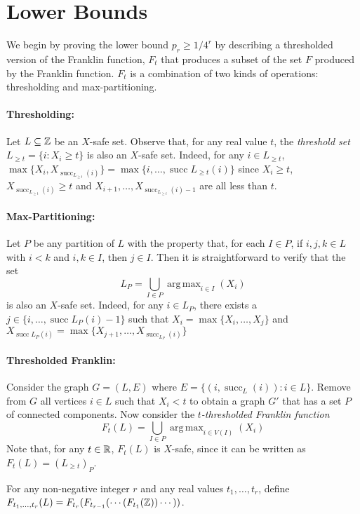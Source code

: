 \documentclass{patmorin}
\DeclareMathOperator*{\argmax}{arg\,max}
\DeclareMathOperator{\cw}{succ}
\begin{document}
\section{Lower Bounds}

We begin by proving the lower bound $p_r \ge 1/4^r$ by describing a
thresholded version of the Franklin function, $F_t$ that produces a
subset of the set $F$ produced by the Franklin function. $F_t$ is a
combination of two kinds of operations: thresholding and max-partitioning.

\paragraph{Thresholding:}
Let $L\subseteq\mathbb{Z}$ be an $X$-safe set.  Observe that, for any real
value $t$, the \emph{threshold set} $L_{\ge t}=\{i:X_i\ge t\}$ is also an
$X$-safe set. Indeed, for any $i\in L_{\ge t}$, $\max\{X_i,X_{\cw_{L_{\ge t}}(i)}\} = \max\{i,\ldots,\cw{L_{\ge t}}(i)\}$ since $X_i\ge t$, $X_{\cw_{L_{\ge t}}(i)}\ge t$ and $X_{i+1},\ldots,X_{\cw_{L_{\ge t}}(i)-1}$ are all less than $t$.

\paragraph{Max-Partitioning:}
Let $P$ be any partition of $L$ with the property that, for each $I\in
P$, if $i,j,k\in L$ with $i < k$ and $i,k\in I$, then $j\in I$. Then it
is straightforward to verify that the set
\[
     L_{P} = \bigcup_{I\in P} \argmax_{i\in I}(X_i)
\]
is also an $X$-safe set. Indeed, for any $i\in L_{P}$, there exists a $j\in\{i,\ldots,\cw{L_P}(i)-1\}$ such that $X_i=\max\{X_i,\ldots,X_j\}$ and $X_{\cw{L_P}(i)}=\max\{X_{j+1},\ldots,X_{\cw_{L_P}(i)}\}$

\paragraph{Thresholded Franklin:}
Consider the graph $G=(L,E)$ where $E=\{(i,\cw_L(i)): i\in L\}$. Remove
from $G$ all vertices $i\in L$ such that $X_i < t$ to obtain a graph
$G'$ that has a set $P$ of connected components.  Now consider the
\emph{$t$-thresholded Franklin function}
\[
    F_t(L) = \bigcup_{I\in P} \argmax_{i\in V(I)}(X_i)
\]
Note that, for any $t\in\mathbb{R}$, $F_t(L)$ is $X$-safe, since it can be
written as $F_t(L) = (L_{\ge t})_P$.

For any non-negative integer $r$ and any real values $t_1,\ldots,t_r$,
define $F_{t_1,\ldots,t_r}(L) = F_{t_r}(F_{t_{r-1}}(\cdots(F_{t_1}(\mathbb{Z}))\cdots ))$.
\end{document}
